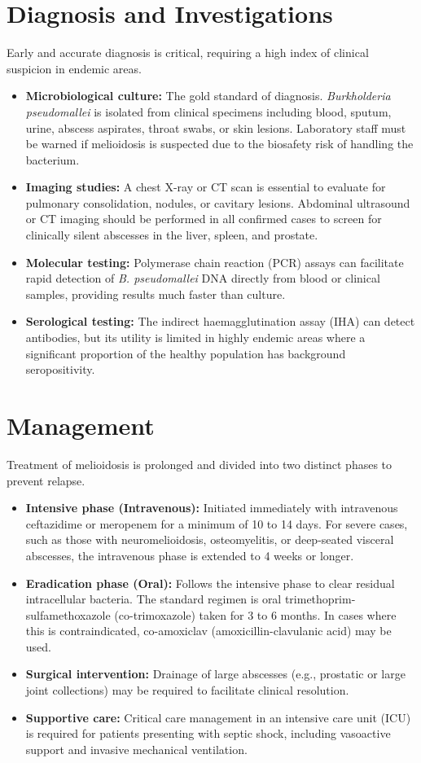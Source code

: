 \section*{Diagnosis and Investigations}
Early and accurate diagnosis is critical, requiring a high index of clinical suspicion in endemic areas.
\begin{itemize}
    \item \textbf{Microbiological culture:} The gold standard of diagnosis. \textit{Burkholderia pseudomallei} is isolated from clinical specimens including blood, sputum, urine, abscess aspirates, throat swabs, or skin lesions. Laboratory staff must be warned if melioidosis is suspected due to the biosafety risk of handling the bacterium.
    \item \textbf{Imaging studies:} A chest X-ray or CT scan is essential to evaluate for pulmonary consolidation, nodules, or cavitary lesions. Abdominal ultrasound or CT imaging should be performed in all confirmed cases to screen for clinically silent abscesses in the liver, spleen, and prostate.
    \item \textbf{Molecular testing:} Polymerase chain reaction (PCR) assays can facilitate rapid detection of \textit{B. pseudomallei} DNA directly from blood or clinical samples, providing results much faster than culture.
    \item \textbf{Serological testing:} The indirect haemagglutination assay (IHA) can detect antibodies, but its utility is limited in highly endemic areas where a significant proportion of the healthy population has background seropositivity.
\end{itemize}

\section*{Management}
Treatment of melioidosis is prolonged and divided into two distinct phases to prevent relapse.
\begin{itemize}
    \item \textbf{Intensive phase (Intravenous):} Initiated immediately with intravenous ceftazidime or meropenem for a minimum of 10 to 14 days. For severe cases, such as those with neuromelioidosis, osteomyelitis, or deep-seated visceral abscesses, the intravenous phase is extended to 4 weeks or longer.
    \item \textbf{Eradication phase (Oral):} Follows the intensive phase to clear residual intracellular bacteria. The standard regimen is oral trimethoprim-sulfamethoxazole (co-trimoxazole) taken for 3 to 6 months. In cases where this is contraindicated, co-amoxiclav (amoxicillin-clavulanic acid) may be used.
    \item \textbf{Surgical intervention:} Drainage of large abscesses (e.g., prostatic or large joint collections) may be required to facilitate clinical resolution.
    \item \textbf{Supportive care:} Critical care management in an intensive care unit (ICU) is required for patients presenting with septic shock, including vasoactive support and invasive mechanical ventilation.
\end{itemize}

